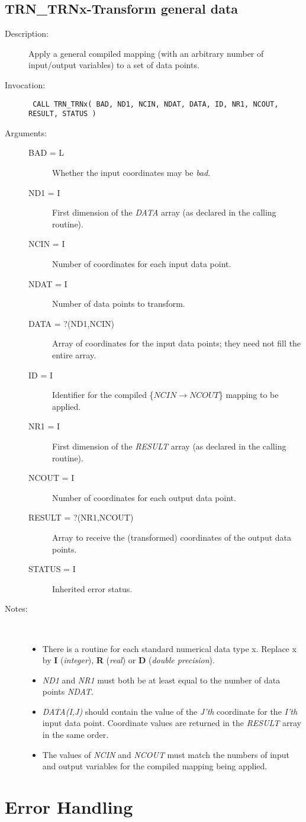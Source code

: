 \documentclass[twoside,11pt]{article}
\newcommand{\xlabel}[1]{}
\newcommand{\fortvar}[1]{\mbox{\emph{#1}}}
\newlength{\sstbannerlength}
\newlength{\sstcaptionlength}
\newlength{\sstexampleslength}
\newlength{\sstexampleswidth}
\newcommand{\sstroutine}[3]{
   \goodbreak
   \rule{\textwidth}{0.5mm}
   \vspace{-7ex}
   \newline
   \settowidth{\sstbannerlength}{{\Large {\bf #1}}}
   \setlength{\sstcaptionlength}{\textwidth}
   \setlength{\sstexampleslength}{\textwidth}
   \addtolength{\sstbannerlength}{0.5em}
   \addtolength{\sstcaptionlength}{-2.0\sstbannerlength}
   \addtolength{\sstcaptionlength}{-5.0pt}
   \settowidth{\sstexampleswidth}{{\bf Examples:}}
   \addtolength{\sstexampleslength}{-\sstexampleswidth}
   \parbox[t]{\sstbannerlength}{\flushleft{\Large {\bf #1}}}
   \parbox[t]{\sstcaptionlength}{\center{\Large #2}}
   \parbox[t]{\sstbannerlength}{\flushright{\Large {\bf #1}}}
   \begin{description}
      #3
   \end{description}
}
\newcommand{\sstdescription}[1]{\item[Description:] #1}
\newcommand{\sstinvocation}[1]{\item[Invocation:]\hspace{0.4em}{\tt #1}}
\newcommand{\sstarguments}[1]{
   \item[Arguments:] \mbox{} \\
   \vspace{-3.5ex}
   \begin{description}
      #1
   \end{description}
}
\newcommand{\sstsubsection}[1]{ \item[{#1}] \mbox{} \\}
\newcommand{\sstnotes}[1]{\item[Notes:] \mbox{} \\[1.3ex] #1}
\newcommand{\sstitemlist}[1]{
  \mbox{} \\
  \vspace{-3.5ex}
  \begin{itemize}
     #1
  \end{itemize}
}
\newcommand{\sstitem}{\item}
\newcommand{\ssttt}{\tt}
\renewcommand{\sstroutine}[3]{
      \subsection{#1\xlabel{#1}-\label{#1}#2}
      \begin{description}
         #3
      \end{description}
   }
\renewcommand{\sstdescription}[1]{\item[Description:]
      \begin{description}
         #1
      \end{description}
   }
\renewcommand{\sstinvocation}[1]{\item[Invocation:]
      \begin{description}
         {\ssttt #1}
      \end{description}
   }
\renewcommand{\sstarguments}[1]{
      \item[Arguments:]
      \begin{description}
         #1
      \end{description}
   }
\renewcommand{\sstsubsection}[1]{\item[{#1}]}
\renewcommand{\sstnotes}[1]{\item[Notes:]
      \begin{description}
         #1
      \end{description}
   }
\newcommand{\sstitemlist}[1]{
      \begin{itemize}
         #1
      \end{itemize}
   }
\begin{document}
\sstroutine{TRN\_TRNx}{Transform general data}
{
   \sstdescription{
       Apply a general compiled mapping (with an arbitrary number of 
       input/output variables) to a set of data points.
   }
   \sstinvocation{
      CALL TRN\_TRNx( BAD, ND1, NCIN, NDAT, DATA, ID, NR1, NCOUT, \\
           RESULT, STATUS )} 
   \sstarguments{
      \sstsubsection{BAD = L}{
         Whether the input coordinates may be {\em bad}.}
      \sstsubsection{ND1 = I}{
         First dimension of the \fortvar{DATA} array (as declared in the 
         calling routine).}
      \sstsubsection{NCIN = I}{
         Number of coordinates for each input data point.}
      \sstsubsection{NDAT = I}{
         Number of data points to transform.}
      \sstsubsection{DATA = ?({\small ND1,NCIN})}{
         Array of coordinates for the input data points; they need not fill 
         the entire array.} 
      \sstsubsection{ID = I}{
         Identifier for the compiled \mbox{\{$NCIN \rightarrow NCOUT$\}} 
         mapping to be applied.}
      \sstsubsection{NR1 = I}{
         First dimension of the \fortvar{RESULT} array (as declared in the 
         calling routine).}
      \sstsubsection{NCOUT = I}{
         Number of coordinates for each output data point.}
      \sstsubsection{RESULT = ?({\small NR1,NCOUT})}{
         Array to receive the (transformed) coordinates of the output 
         data points.} 
      \sstsubsection{STATUS = I}{
         Inherited error status.}
   }
   \sstnotes{
      \sstitemlist{
         \sstitem
         There is a routine for each standard numerical data type x.
         Replace x by \textbf{I} (\emph{integer}), \textbf{R} (\emph{real}) 
         or \textbf{D} (\emph{double precision}). 

         \sstitem
         \fortvar{ND1} and \fortvar{NR1} must both be at least equal to the
         number of data points \fortvar{NDAT}.

         \sstitem
         \fortvar{DATA(I,J)} should contain the value of the \fortvar{J'th}
         coordinate for the \fortvar{I'th} input data point.
         Coordinate values are returned in the \fortvar{RESULT} array in the
         same order. 

         \sstitem
         The values of \fortvar{NCIN} and \fortvar{NCOUT} must match the
         numbers of input and output variables for the compiled
         mapping being applied. 
      }
   }
}

\newpage
\section {Error Handling}
\end{document}
